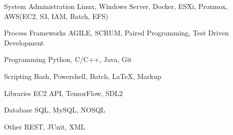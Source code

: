 
\begin{cvskills}

  \cvskill
    {System Administration} %
    {Linux, Windows Server, Docker, ESXi, Proxmox, AWS(EC2, S3, IAM, Batch, EFS)} %

  \cvskill
    {Process Frameworks} %
    {AGILE, SCRUM, Paired Programming, Test Driven Development} %

  \cvskill
    {Programming} %
    {Python, C/C++, Java, Git} %

  \cvskill
    {Scripting} %
    {Bash, Powershell, Batch, LaTeX, Markup} %

  \cvskill
    {Libraries} %
    {EC2 API, TensorFlow, SDL2} %
    
  \cvskill
    {Database} %
    {SQL, MySQL, NOSQL} %
    
  \cvskill
    {Other} %
    {REST, JUnit, XML} %
    
\end{cvskills}
